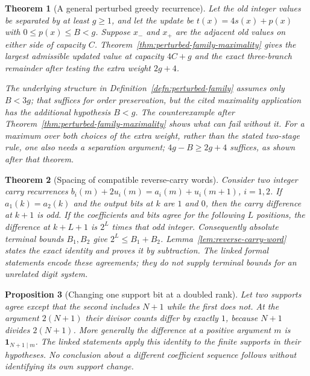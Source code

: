 \documentclass[11pt]{article}
\theoremstyle{plain}
\newtheorem{thm}{Theorem}[section]
\newtheorem{prop}[thm]{Proposition}
\theoremstyle{definition}
\theoremstyle{remark}
\begin{document}
\begin{thm}[A general perturbed greedy recurrence]\label{record:257bm-i15}
Let the old integer values be separated by at least $g\ge1$,
and let the update be $t(x)=4s(x)+p(x)$ with
$0\le p(x)\le B<g$.  Suppose $x_-$ and $x_+$ are the adjacent
old values on either side of capacity $C$.
Theorem~\ref{thm:perturbed-family-maximality} gives the largest
admissible updated value at capacity $4C+g$ and the exact three-branch
remainder after testing the extra weight $2g+4$.

The underlying structure in
Definition~\ref{defn:perturbed-family} assumes only $B<3g$;
that suffices for order preservation, but the cited maximality
application has the additional hypothesis $B<g$.
The counterexample after Theorem~\ref{thm:perturbed-family-maximality}
shows what can fail without it.  For a maximum over both choices of the extra weight, rather than
the stated two-stage rule, one also needs a separation argument;
$4g-B\ge2g+4$ suffices, as shown after that theorem.
\end{thm}

\begin{thm}[Spacing of compatible reverse-carry words]\label{record:257bm-i16}
Consider two integer carry recurrences
$b_i(m)+2u_i(m)=a_i(m)+u_i(m+1)$, $i=1,2$.
If $a_1(k)=a_2(k)$ and the output bits at $k$ are $1$ and $0$,
then the carry difference at $k+1$ is odd.  If the coefficients
and bits agree for the following $L$ positions, the difference
at $k+L+1$ is $2^L$ times that odd integer.
Consequently absolute terminal bounds $B_1,B_2$ give
$2^L\le B_1+B_2$.
Lemma~\ref{lem:reverse-carry-word} states the exact identity and
proves it by subtraction.  The linked formal statements encode
these agreements; they do not supply terminal bounds for an
unrelated digit system.
\end{thm}

\begin{prop}[Changing one support bit at a doubled rank]\label{record:257bm-i17}
Let two supports agree except that the second includes $N+1$
while the first does not.  At the argument $2(N+1)$ their divisor
counts differ by exactly $1$, because $N+1$ divides $2(N+1)$.
More generally the difference at a positive argument $m$ is
$\mathbf1_{N+1\mid m}$.  The linked statements apply this identity
to the finite supports in their hypotheses.  No conclusion about
a different coefficient sequence follows without identifying its
own support change.
\end{prop}
\end{document}
